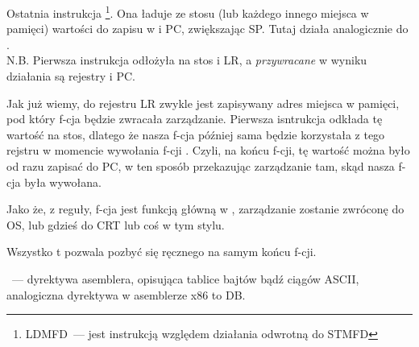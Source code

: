 Ostatnia instrukcja \footnote{\ac{LDMFD}~--- jest instrukcją względem działania odwrotną do \ac{STMFD}}.
Ona ładuje ze stosu (lub każdego innego miejsca w pamięci) wartości do zapisu w  i \ac{PC}, zwiększając  \ac{SP}.
Tutaj działa analogicznie do \POP.\\
N.B. Pierwsza instrukcja  odłożyła na stos  i \ac{LR}, a \emph{przywracane} w wyniku działania  są rejestry  i \ac{PC}.

Jak już wiemy, do rejestru \ac{LR} zwykle jest zapisywany adres miejsca w pamięci, pod który f-cja będzie zwracała zarządzanie.
Pierwsza isntrukcja odkłada tę wartość na stos, dlatego że nasza f-cja \main później sama będzie korzystała z tego rejstru w momencie wywołania f-cji \printf.
Czyli, na końcu f-cji, tę wartość można było od razu zapisać do \ac{PC}, w ten sposób przekazując zarządzanie tam, skąd nasza f-cja była wywołana.

Jako że, z reguły, f-cja \main jest funkcją główną w \CCpp, zarządzanie zostanie zwróconę do \ac{OS}, lub gdzieś do \ac{CRT} 
lub coś w tym stylu.

Wszystko t pozwala pozbyć się ręcznego  na samym końcu f-cji.

~--- dyrektywa asemblera, opisująca tablice bajtów bądź ciągów ASCII, analogiczna dyrektywa w asemblerze x86 to DB.


